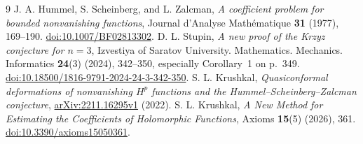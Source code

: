 \begin{thebibliography}{9}
 J. A. Hummel, S. Scheinberg, and L. Zalcman,
\emph{A coefficient problem for bounded nonvanishing functions},
Journal d'Analyse Math\'ematique \textbf{31} (1977), 169--190.
\href{https://doi.org/10.1007/BF02813302}{doi:10.1007/BF02813302}.
 D. L. Stupin,
\emph{A new proof of the Krzyz conjecture for $n=3$},
Izvestiya of Saratov University. Mathematics. Mechanics. Informatics
\textbf{24}(3) (2024), 342--350, especially Corollary~1 on p.~349.
\href{https://doi.org/10.18500/1816-9791-2024-24-3-342-350}{doi:10.18500/1816-9791-2024-24-3-342-350}.
 S. L. Krushkal,
\emph{Quasiconformal deformations of nonvanishing $H^p$ functions
and the Hummel--Scheinberg--Zalcman conjecture},
\href{https://arxiv.org/abs/2211.16295}{arXiv:2211.16295v1} (2022).
 S. L. Krushkal,
\emph{A New Method for Estimating the Coefficients of Holomorphic Functions},
Axioms \textbf{15}(5) (2026), 361.
\href{https://doi.org/10.3390/axioms15050361}{doi:10.3390/axioms15050361}.
\end{thebibliography}

